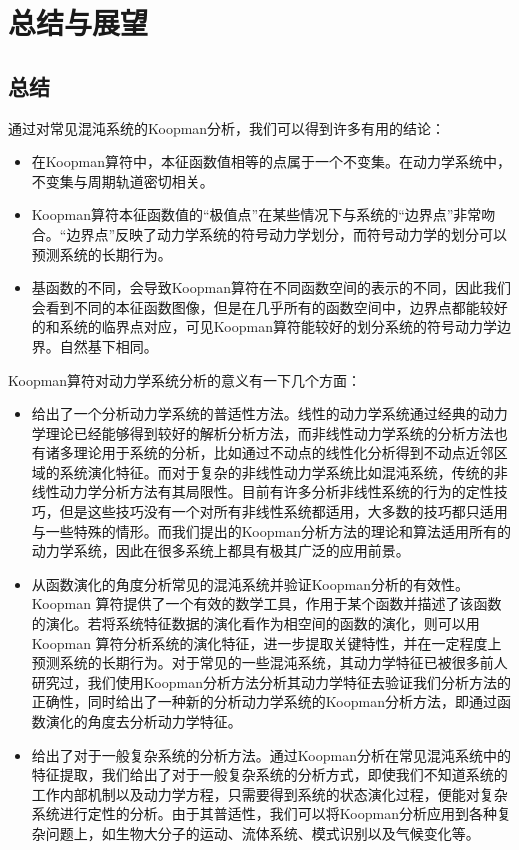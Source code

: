 \chapter{总结与展望}
\section{总结}

通过对常见混沌系统的Koopman分析，我们可以得到许多有用的结论：
\begin{itemize}
    \item 在Koopman算符中，本征函数值相等的点属于一个不变集。在动力学系统中，不变集与周期轨道密切相关。
    \item Koopman算符本征函数值的“极值点”在某些情况下与系统的“边界点”非常吻合。“边界点”反映了动力学系统的符号动力学划分，而符号动力学的划分可以预测系统的长期行为。
    \item 基函数的不同，会导致Koopman算符在不同函数空间的表示的不同，因此我们会看到不同的本征函数图像，但是在几乎所有的函数空间中，边界点都能较好的和系统的临界点对应，可见Koopman算符能较好的划分系统的符号动力学边界。自然基下相同。
\end{itemize}

Koopman算符对动力学系统分析的意义有一下几个方面：
\begin{itemize}
    \item 给出了一个分析动力学系统的普适性方法。线性的动力学系统通过经典的动力学理论已经能够得到较好的解析分析方法，而非线性动力学系统的分析方法也有诸多理论用于系统的分析，比如通过不动点的线性化分析得到不动点近邻区域的系统演化特征。而对于复杂的非线性动力学系统比如混沌系统，传统的非线性动力学分析方法有其局限性。目前有许多分析非线性系统的行为的定性技巧，但是这些技巧没有一个对所有非线性系统都适用，大多数的技巧都只适用与一些特殊的情形。而我们提出的Koopman分析方法的理论和算法适用所有的动力学系统，因此在很多系统上都具有极其广泛的应用前景。
    \item 从函数演化的角度分析常见的混沌系统并验证Koopman分析的有效性。Koopman 算符提供了一个有效的数学工具，作用于某个函数并描述了该函数的演化。若将系统特征数据的演化看作为相空间的函数的演化，则可以用Koopman 算符分析系统的演化特征，进一步提取关键特性，并在一定程度上预测系统的长期行为。对于常见的一些混沌系统，其动力学特征已被很多前人研究过，我们使用Koopman分析方法分析其动力学特征去验证我们分析方法的正确性，同时给出了一种新的分析动力学系统的Koopman分析方法，即通过函数演化的角度去分析动力学特征。
    \item 给出了对于一般复杂系统的分析方法。通过Koopman分析在常见混沌系统中的特征提取，我们给出了对于一般复杂系统的分析方式，即使我们不知道系统的工作内部机制以及动力学方程，只需要得到系统的状态演化过程，便能对复杂系统进行定性的分析。由于其普适性，我们可以将Koopman分析应用到各种复杂问题上，如生物大分子的运动、流体系统、模式识别以及气候变化等。
\end{itemize}

